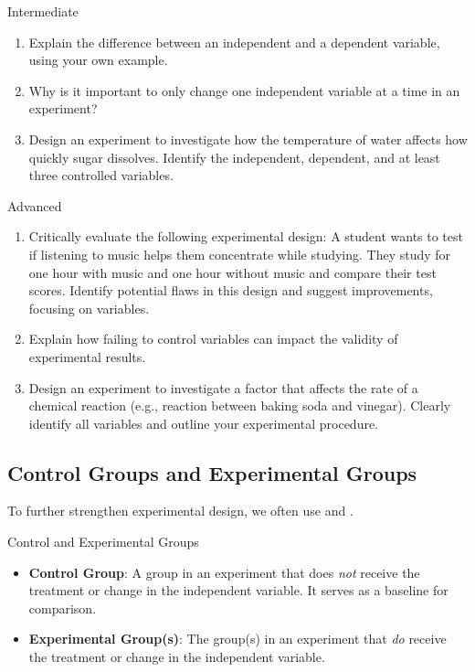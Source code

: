 \begin{tieredquestions}{Intermediate}
\begin{enumerate}
    \item Explain the difference between an independent and a dependent variable, using your own example.
    \item Why is it important to only change one independent variable at a time in an experiment?
    \item Design an experiment to investigate how the temperature of water affects how quickly sugar dissolves.  Identify the independent, dependent, and at least three controlled variables.
\end{enumerate}
\end{tieredquestions}

\begin{tieredquestions}{Advanced}
\begin{enumerate}
    \item  Critically evaluate the following experimental design: A student wants to test if listening to music helps them concentrate while studying. They study for one hour with music and one hour without music and compare their test scores.  Identify potential flaws in this design and suggest improvements, focusing on variables.
    \item Explain how failing to control variables can impact the validity of experimental results.
    \item  Design an experiment to investigate a factor that affects the rate of a chemical reaction (e.g., reaction between baking soda and vinegar). Clearly identify all variables and outline your experimental procedure.
\end{enumerate}
\end{tieredquestions}

\subsection{Control Groups and Experimental Groups}

To further strengthen experimental design, we often use  and .

\begin{keyconcept}{Control and Experimental Groups}
\begin{itemize}
    \item \textbf{Control Group}: A group in an experiment that does \textit{not} receive the treatment or change in the independent variable. It serves as a baseline for comparison.
    \item \textbf{Experimental Group(s)}:  The group(s) in an experiment that \textit{do} receive the treatment or change in the independent variable.
\end{itemize}
\end{keyconcept}

